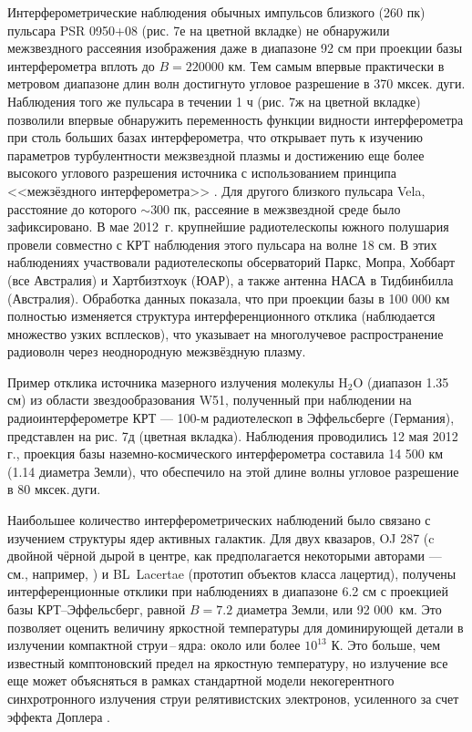 Интерферометрические наблюдения обычных импульсов близкого (260 пк) пульсара PSR 0950+08 (рис. 7е на
цветной вкладке) не обнаружили межзвездного рассеяния изображения даже в диапазоне 92 см при
проекции базы интерферометра вплоть до $B=220 000$ км. Тем самым впервые практически в метровом
диапазоне длин волн достигнуто угловое разрешение в  370 мксек. дуги. Наблюдения того же пульсара в
течении 1 ч (рис. 7ж на цветной вкладке) позволили впервые обнаружить переменность функции видности
интерферометра при столь больших базах интерферометра, что открывает путь к изучению параметров
турбулентности межзвездной плазмы и достижению еще более высокого углового разрешения источника с
использованием принципа <<межзёздного интерферометра>> \cite{Wolszczan_1987}. Для другого близкого
пульсара Vela, расстояние до которого $\sim 300$ пк, рассеяние в межзвездной среде было
зафиксировано. В мае 2012~г. крупнейшие радиотелескопы южного полушария провели совместно с КРТ
наблюдения этого пульсара на волне 18 см. В этих наблюдениях участвовали радиотелескопы обсерваторий
Паркс, Мопра, Хоббарт (все Австралия) и Хартбизтхоук (ЮАР), а также антенна НАСА в Тидбинбилла
(Австралия). Обработка данных показала, что при проекции базы в 100 000 км полностью изменяется
структура интерференционного отклика (наблюдается множество узких всплесков), что указывает на
многолучевое распространение радиоволн через неоднородную межзвёздную плазму.

Пример отклика источника мазерного излучения молекулы H$_2$O (диапазон 1.35 см) из области
звездообразования W51, полученный при наблюдении на радиоинтерферометре КРТ --- 100-м  радиотелескоп
в Эффельсберге (Германия), представлен на рис. 7д (цветная вкладка). Наблюдения проводились 12 мая
2012 г., проекция базы наземно-космического интерферометра составила 14 500 км (1.14 диаметра
Земли), что обеспечило на этой длине волны угловое разрешение в 80 мксек.\,дуги.

Наибольшее количество интерферометрических наблюдений было связано с изучением структуры ядер
активных галактик. Для двух квазаров, OJ 287 (c двойной чёрной дырой в центре, как предполагается
некоторыми авторами --- см., например, \cite{Valtonen_2011}) и BL~Lacertae (прототип объектов класса
лацертид), получены интерференционные отклики при наблюдениях в диапазоне 6.2 см с проекцией базы
КРТ--Эффельсберг, равной $B = 7.2$ диаметра Земли, или 92 000~км. Это позволяет оценить величину
яркостной температуры для доминирующей детали в излучении компактной струи\,--\,ядра: около или
более $10^{13}$ К. Это больше, чем известный комптоновский предел \cite{Kellermann_1969} на
яркостную температуру, но излучение все еще может объясняться в рамках стандартной модели
некогерентного синхротронного излучения струи релятивистских электронов, усиленного за счет эффекта
Доплера \cite{Cohen_2007}.

